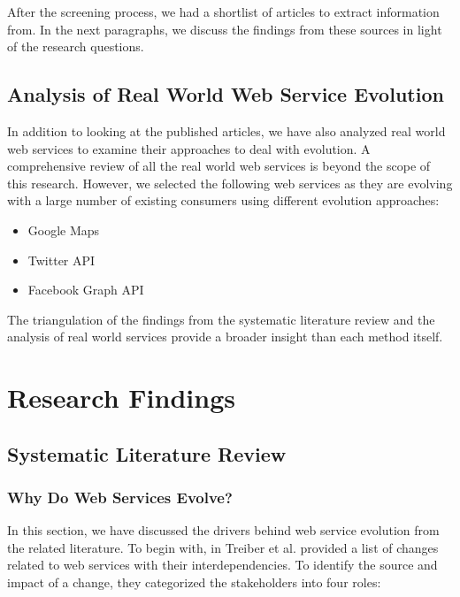 \documentclass[runningheads,a4paper]{llncs}
\begin{document}
After the screening process, we had a shortlist of articles to extract information from. In the next paragraphs, we discuss the findings from these sources in light of the research questions.

\subsection{Analysis of Real World Web Service Evolution} %
\label{sub:analysis_of_real_world_web_service_evolution}
In addition to looking at the published articles, we have also analyzed real world web services to examine their approaches to deal with evolution. A comprehensive review of all the real world web services is beyond the scope of this research. However, we selected the following web services as they are evolving with a large number of existing consumers using different evolution approaches:

\begin{itemize}
  \item Google Maps
  \item Twitter API
  \item Facebook Graph API
\end{itemize}

The triangulation of the findings from the systematic literature review and the analysis of real world services provide a broader insight than each method itself.



\section{Research Findings} %
\label{sec:research_findings}

\subsection{Systematic Literature Review} %
\label{sub:literature_review}

\subsubsection{Why Do Web Services Evolve?} %
\label{sub:why_do_web_services_change}
In this section, we have discussed the drivers behind web service evolution from the related literature. To begin with, in \cite{treiber2009analyzing} Treiber et al. provided a list of changes related to web services with their interdependencies. To identify the source and impact of a change, they categorized the stakeholders into four roles:
\end{document}
